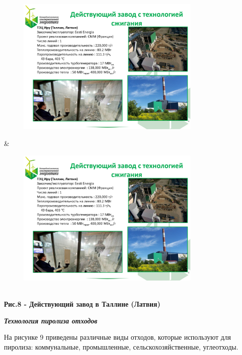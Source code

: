 \begin{figure}[H]
	\centering
	\includegraphics[width=0.8\textwidth]{media/chem2/image71}
	\caption*{}
\end{figure}
 &
\begin{figure}[H]
	\centering
	\includegraphics[width=0.8\textwidth]{media/chem2/image71}
	\caption*{}
\end{figure}
 \\

{\bfseries Рис.8 - Действующий завод в Таллине (Латвия)}

\emph{{\bfseries Технология пиролиза отходов}}

На рисунке 9 приведены различные виды отходов, которые используют для
пиролиза: коммунальные, промышленные, сельскохозяйственные, углеотходы.


